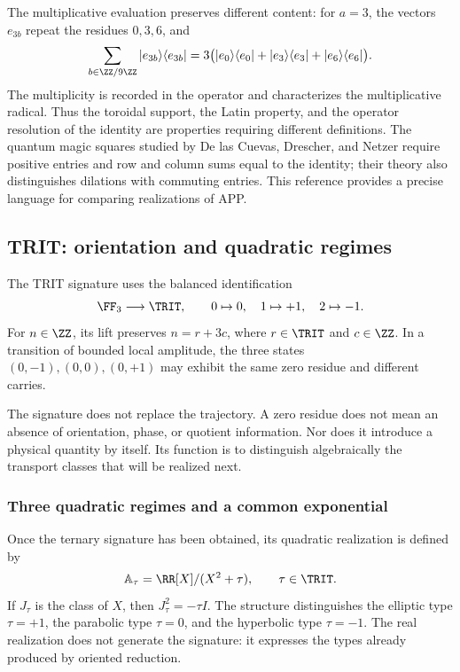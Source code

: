 The multiplicative evaluation preserves different content: for \(a=3\), the
vectors \(e_{3b}\) repeat the residues \(0,3,6\), and
\[
 \sum_{b\in\ZZ/9\ZZ}|e_{3b}\rangle\langle e_{3b}|
 =3\bigl(|e_0\rangle\langle e_0|+|e_3\rangle\langle e_3|
                    +|e_6\rangle\langle e_6|\bigr).
\]
The multiplicity is recorded in the operator and characterizes the multiplicative
radical. Thus the toroidal support, the Latin property, and the operator
resolution of the identity are properties requiring different definitions.
The quantum magic squares studied by De las Cuevas, Drescher, and Netzer
require positive entries and row and column sums equal to the identity;
their theory also distinguishes dilations with commuting entries\cite{delascuevas2020}.
This reference provides a precise language for comparing realizations of APP.

\subsection{TRIT: orientation and quadratic regimes}

\begin{definition}
The TRIT signature uses the balanced identification
\[
 \FF_3\longrightarrow\TRIT,\qquad 0\mapsto0,\quad1\mapsto+1,\quad2\mapsto-1.
\]
For \(n\in\ZZ\), its lift preserves \(n=r+3c\), where \(r\in\TRIT\) and \(c\in\ZZ\). In a transition of bounded local amplitude, the three states \((0,-1),(0,0),(0,+1)\) may exhibit the same zero residue and different carries.
\end{definition}

The signature does not replace the trajectory. A zero residue does not mean an absence of orientation, phase, or quotient information. Nor does it introduce a physical quantity by itself. Its function is to distinguish algebraically the transport classes that will be realized next.

\subsubsection{Three quadratic regimes and a common exponential}

Once the ternary signature has been obtained, its quadratic realization is defined by
\begin{equation}
 \mathbb A_\tau=\RR[X]/(X^2+\tau),\qquad \tau\in\TRIT.
 \label{eq:algebras-trit}
\end{equation}
If \(J_\tau\) is the class of \(X\), then \(J_\tau^2=-\tau I\). The structure distinguishes the elliptic type \(\tau=+1\), the parabolic type \(\tau=0\), and the hyperbolic type \(\tau=-1\). The real realization does not generate the signature: it expresses the types already produced by oriented reduction.

